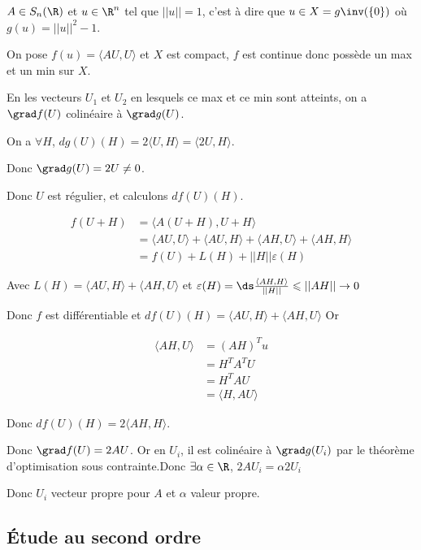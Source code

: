 \begin{exemple}
    $A \in S_n(\R)$ et $u \in \R^n$ tel que $||u|| = 1$, c'est à dire que $u \in X = g\inv (\{0\})$ où 
    $g(u) = ||u||^2 - 1$.

    On pose $f(u) = \langle AU , U \rangle$ et $X$ est compact, $f$ est continue donc possède un max 
    et un min sur $X$. 

    En les vecteurs $U_1$ et $U_2$ en lesquels ce max et ce min sont atteints, on a 
    $\grad f(U)$ colinéaire à $\grad g(U)$. 

    On a $\forall H$, $dg(U)(H) = 2 \langle U , H \rangle = \langle 2 U , H \rangle$.

    Donc $\grad g (U) = 2 U \neq 0$. 

    Donc $U$ est régulier, et calculons $df(U)(H)$. 

    \begin{align}
        f(U + H) & = \langle A(U + H), U + H \rangle \\
        & = \langle AU, U \rangle + \langle AU, H \rangle + \langle AH, U \rangle + \langle AH, H \rangle \\
        & = f(U) + L(H) + ||H|| \varepsilon(H)
    \end{align}

    Avec $L(H) = \langle AU, H \rangle + \langle AH, U \rangle$ et $\varepsilon(H) = \ds \frac{\langle AH, H \rangle }{ || H||} \leqslant ||AH|| \to 0$

    Donc $f$ est différentiable et $df(U)(H) = \langle AU, H \rangle + \langle AH, U \rangle$
    Or 

    \begin{align}
        \langle AH, U \rangle & = (AH)^T u \\
        & = H^T A^T U \\
        & = H^T AU \\
        & = \langle H, AU \rangle 
    \end{align}

    Donc $df(U)(H) = 2 \langle AH, H \rangle$. 

    Donc $\grad f (U) = 2 AU$. Or en $U_i$, il est colinéaire à $\grad g (U_i)$ par 
    le théorème d'optimisation sous contrainte.Donc $\exists \alpha \in \R$, $2AU_i =  \alpha 2 U_i$

    Donc $U_i$ vecteur propre pour $A$ et $\alpha$ valeur propre. 
\end{exemple}


\subsection{\'Etude au second ordre}

